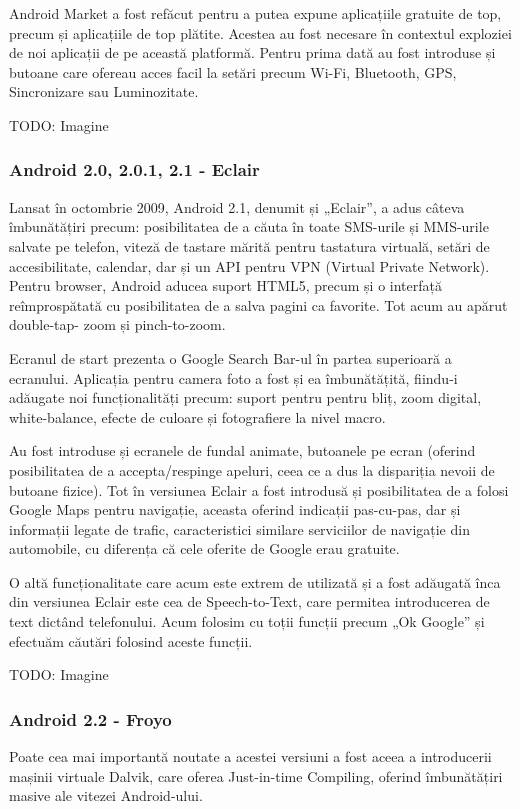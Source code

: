 \documentclass[12pt,a4paper]{article}
\begin{document}
	Android Market a fost refăcut pentru a putea expune aplicațiile gratuite de top, precum și aplicațiile de top plătite. Acestea au fost necesare în contextul exploziei de noi aplicații de pe această platformă. Pentru prima dată au fost introduse și butoane care ofereau acces facil la setări precum Wi-Fi, Bluetooth, GPS, Sincronizare sau Luminozitate.

	TODO: Imagine

\subsubsection{Android 2.0, 2.0.1, 2.1 - Eclair}
Lansat în octombrie 2009, Android 2.1, denumit și „Eclair”, a adus câteva îmbunătățiri precum: posibilitatea de a căuta în toate SMS-urile și MMS-urile salvate pe telefon, viteză de tastare mărită pentru tastatura virtuală, setări de accesibilitate, calendar, dar și un API pentru VPN (Virtual Private Network). Pentru browser, Android aducea suport HTML5, precum și o interfață reîmprospătată cu posibilitatea de a salva pagini ca favorite. Tot acum au apărut double-tap- zoom și pinch-to-zoom.
	
	Ecranul de start prezenta o Google Search Bar-ul în partea superioară a ecranului. Aplicația pentru camera foto a fost și ea îmbunătățită, fiindu-i adăugate noi funcționalități precum: suport pentru pentru bliț, zoom digital, white-balance, efecte de culoare și fotografiere la nivel macro.

	Au fost introduse și ecranele de fundal animate, butoanele pe ecran (oferind posibilitatea de a accepta/respinge apeluri, ceea ce a dus la dispariția nevoii de butoane fizice). Tot în versiunea Eclair a fost introdusă și posibilitatea de a folosi Google Maps pentru navigație, aceasta oferind indicații pas-cu-pas, dar și informații legate de trafic, caracteristici similare serviciilor de navigație din automobile, cu diferența că cele oferite de Google erau gratuite.

	O altă funcționalitate care acum este extrem de utilizată și a fost adăugată înca din versiunea Eclair este cea de Speech-to-Text, care permitea introducerea de text dictând telefonului. Acum folosim cu toții funcții precum „Ok Google” și efectuăm căutări folosind aceste funcții.
	
	TODO: Imagine

\subsubsection{Android 2.2 - Froyo}
Poate cea mai importantă noutate a acestei versiuni a fost aceea a introducerii mașinii virtuale Dalvik, care oferea Just-in-time Compiling, oferind îmbunătățiri masive ale vitezei Android-ului.
\end{document}
